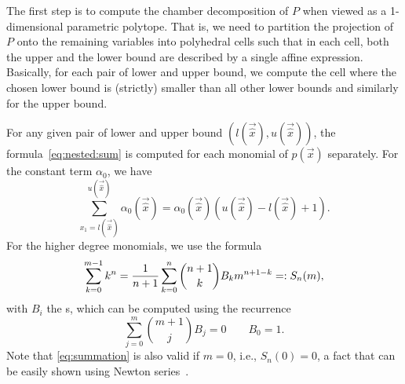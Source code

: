 The first step is to compute the chamber decomposition of $P$ when viewed
as a 1-dimensional parametric polytope.  That is, we need to partition
the projection of $P$ onto the remaining variables into polyhedral cells
such that in each cell, both the upper and the lower bound are described
by a single affine expression.  Basically, for each pair of lower and upper
bound, we compute the cell where the chosen lower bound is (strictly)
smaller than all other lower bounds and similarly for the upper bound.

For any given pair of lower and upper bound $(l(\vec {\hat x}), u(\vec{\hat x}))$,
the formula~\eqref{eq:nested:sum} is computed for each monomial of $p(\vec x)$
separately.  For the constant term $\alpha_0$, we have
$$
\sum_{x_1 = l(\vec {\hat x})}^{u(\vec{\hat x})} \alpha_0(\vec{\hat x})
    = \alpha_0(\vec{\hat x}) \left(u(\vec{\hat x}) - l(\vec {\hat x}) + 1\right)
.
$$
For the higher degree monomials, we use the formula
\begin{equation}
\label{eq:summation}
\sum_{k=0}^{m-1} k^n = {1\over{n+1}}\sum_{k=0}^n{n+1\choose{k}} B_k m^{n+1-k}
=: S_n(m)
,
\end{equation}
with $B_i$ the s, which can be computed
using the recurrence
\begin{equation}
\label{eq:Bernoulli}
    \sum_{j=0}^m{m+1\choose{j}}B_j = 0
\qquad B_0 = 1
.
\end{equation}
Note that \eqref{eq:summation} is also valid if $m = 0$,
i.e., $S_n(0) = 0$, a fact
that can be easily shown using Newton series~.


